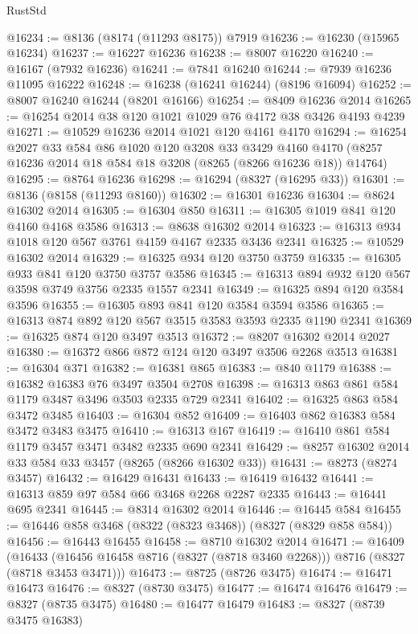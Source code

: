 \begin{lexlean}{RustStd}
\begin{coremodule}
{\begin{coremodule}
{{{{{{{{{{{{{{{{{{{{{{{{{{{{{{{{{{{{{{{{{{{{{{{{{{{{{{@16234 := @8136 (@8174 (@11293 @8175)) @7919
@16236 := @16230 (@15965 @16234)
@16237 := @16227 @16236
@16238 := @8007 @16220
@16240 := @16167 (@7932 @16236)
@16241 := @7841 @16240
@16244 := @7939 @16236 @11095 @16222
@16248 := @16238 (@16241 @16244) (@8196 @16094)
@16252 := @8007 @16240 @16244 (@8201 @16166)
@16254 := @8409 @16236 @2014
@16265 := @16254 @2014 @38 @120 @1021 @1029 @76 @4172 @38 @3426 @4193 @4239
@16271 := @10529 @16236 @2014 @1021 @120 @4161 @4170
@16294 := @16254
    @2027
    @33
    @584
    @86
    @1020
    @120
    @3208
    @33
    @3429
    @4160
    @4170
    (@8257 @16236 @2014 @18 @584 @18 @3208 (@8265 (@8266 @16236 @18)) @14764)
@16295 := @8764 @16236
@16298 := @16294 (@8327 (@16295 @33))
@16301 := @8136 (@8158 (@11293 @8160))
@16302 := @16301 @16236
@16304 := @8624 @16302 @2014
@16305 := @16304 @850
@16311 := @16305 @1019 @841 @120 @4160 @4168 @3586
@16313 := @8638 @16302 @2014
@16323 := @16313 @934 @1018 @120 @567 @3761 @4159 @4167 @2335 @3436 @2341
@16325 := @10529 @16302 @2014
@16329 := @16325 @934 @120 @3750 @3759
@16335 := @16305 @933 @841 @120 @3750 @3757 @3586
@16345 := @16313 @894 @932 @120 @567 @3598 @3749 @3756 @2335 @1557 @2341
@16349 := @16325 @894 @120 @3584 @3596
@16355 := @16305 @893 @841 @120 @3584 @3594 @3586
@16365 := @16313 @874 @892 @120 @567 @3515 @3583 @3593 @2335 @1190 @2341
@16369 := @16325 @874 @120 @3497 @3513
@16372 := @8207 @16302 @2014 @2027
@16380 := @16372 @866 @872 @124 @120 @3497 @3506 @2268 @3513
@16381 := @16304 @371
@16382 := @16381 @865
@16383 := @840 @1179
@16388 := @16382 @16383 @76 @3497 @3504 @2708
@16398 := @16313 @863 @861 @584 @1179 @3487 @3496 @3503 @2335 @729 @2341
@16402 := @16325 @863 @584 @3472 @3485
@16403 := @16304 @852
@16409 := @16403 @862 @16383 @584 @3472 @3483 @3475
@16410 := @16313 @167
@16419 := @16410 @861 @584 @1179 @3457 @3471 @3482 @2335 @690 @2341
@16429 := @8257 @16302 @2014 @33 @584 @33 @3457 (@8265 (@8266 @16302 @33))
@16431 := @8273 (@8274 @3457)
@16432 := @16429 @16431
@16433 := @16419 @16432
@16441 := @16313 @859 @97 @584 @66 @3468 @2268 @2287 @2335
@16443 := @16441 @695 @2341
@16445 := @8314 @16302 @2014
@16446 := @16445 @584
@16455 := @16446 @858 @3468 (@8322 (@8323 @3468)) (@8327 (@8329 @858 @584))
@16456 := @16443 @16455
@16458 := @8710 @16302 @2014
@16471 := @16409
    (@16433 (@16456 @16458 @8716 (@8327 (@8718 @3460 @2268))) @8716 (@8327 (@8718 @3453 @3471)))
@16473 := @8725 (@8726 @3475)
@16474 := @16471 @16473
@16476 := @8327 (@8730 @3475)
@16477 := @16474 @16476
@16479 := @8327 (@8735 @3475)
@16480 := @16477 @16479
@16483 := @8327 (@8739 @3475 @16383)
}}}}}}}}}}}}}}}}}}}}}}}}}}}}}}}}}}}}}}}}}}}}}}}}}}}}}}
\end{coremodule}}
\end{coremodule}
\end{lexlean}

